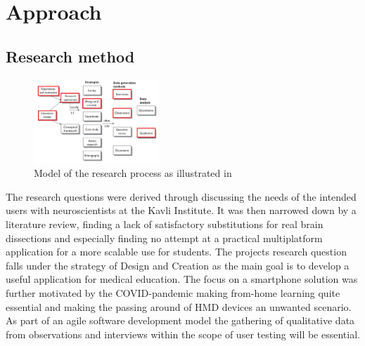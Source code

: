 


\section{Approach}


\subsection*{Research method}

\begin{figure}
    \begin{center}
        \includegraphics[width=0.42\textwidth]{fig/researchplan_image}
    \end{center}
    \caption{Model of the research process as illustrated in \citet{oates2006}}
    \label{researchplan_img}
\end{figure}

The research questions were derived through discussing the needs of the intended users with neuroscientists at the Kavli Institute. It was then narrowed down by a literature review, finding a lack of satisfactory substitutions for real brain dissections and especially finding no attempt at a practical multiplatform application for a more scalable use for students. The projects research question falls under the strategy of Design and Creation as the main goal is to develop a useful application for medical education. The focus on a smartphone solution was further motivated by the COVID-pandemic making from-home learning quite essential and making the passing around of HMD devices an unwanted scenario. As part of an agile software development model the gathering of qualitative data from observations and interviews within the scope of user testing will be essential. 

